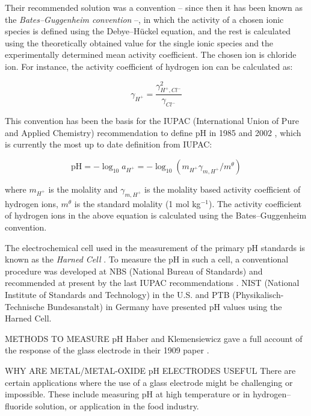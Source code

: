 \documentclass[manuscript=article, journal=jceda8]{achemso}
\begin{document}
Their recommended solution was a convention -- since then it has been known as the \emph{Bates--Guggenheim convention} --, in which the activity of a chosen ionic species is defined using the Debye--Hückel equation, and the rest is calculated using the theoretically obtained value for the single ionic species and the experimentally determined mean activity coefficient. The chosen ion is chloride ion. For instance, the activity coefficient of hydrogen ion can be calculated as:

\begin{equation}
\gamma_{H^+} = \frac{\gamma_{H^+, Cl^-}^2}{\gamma_{Cl^-}}
\end{equation}

This convention has been the basis for the IUPAC (International Union of Pure and Applied Chemistry) recommendation to define pH in 1985 \cite{covington1985definition} and 2002 \cite{buck2002measurement}, which is currently the most up to date definition from IUPAC:

\begin{equation}
\textrm{pH}= -\log_{10}a_{H^+} = -\log_{10}(m_{H^+} \gamma_{m, H^+}/m^\theta)
\end{equation}

where $m_{H^+}$ is the molality and $\gamma_{m, H^+}$ is the molality based activity coefficient of hydrogen ions, $m^\theta$ is the standard molality (1 mol kg$^{-1}$). The activity coefficient of hydrogen ions in the above equation is calculated using the Bates--Guggenheim convention.




The electrochemical cell used in the measurement of the primary pH standards is known as the \emph{Harned Cell} \cite{harned1958activity}.
To measure the pH in such a cell, a conventional procedure was developed at NBS (National Bureau of Standards) \cite{durst1975standardization} and recommended at present by the last IUPAC recommendations \cite{covington2002measurement}.
NIST (National Institute of Standards and Technology) in the U.S. and PTB (Physikalisch-Technische Bundesanstalt) in Germany have presented pH values using the Harned Cell. 


METHODS TO MEASURE pH
Haber and Klemensiewicz gave a full account of the response of the glass electrode in their 1909 paper \cite{haber1909elektrische, haber1909concerning}.


WHY ARE METAL/METAL-OXIDE pH ELECTRODES USEFUL
There are certain applications where the use of a glass electrode might be challenging or impossible.
These include measuring pH at high temperature or in hydrogen--fluoride solution, or application in the food industry. 
\end{document}
